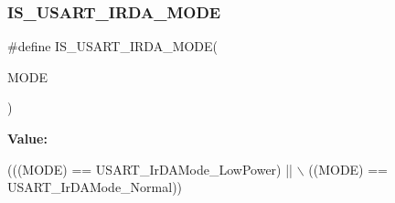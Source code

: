 \subsubsection{\texorpdfstring{I\+S\+\_\+\+U\+S\+A\+R\+T\+\_\+\+I\+R\+D\+A\+\_\+\+M\+O\+DE}{IS\_USART\_IRDA\_MODE}}
{\footnotesize\ttfamily \#define I\+S\+\_\+\+U\+S\+A\+R\+T\+\_\+\+I\+R\+D\+A\+\_\+\+M\+O\+DE(\begin{DoxyParamCaption}\item[{}]{M\+O\+DE }\end{DoxyParamCaption})}

{\bfseries Value\+:}
\begin{DoxyCode}
(((MODE) == USART\_IrDAMode\_LowPower) || \(\backslash\)
                                  ((MODE) == USART\_IrDAMode\_Normal))
\end{DoxyCode}
